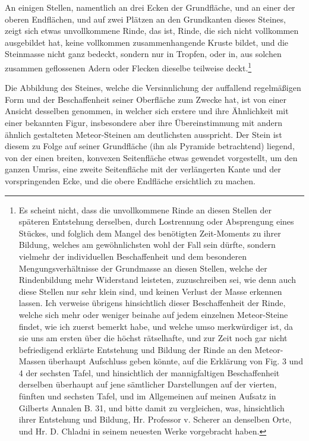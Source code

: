 \documentclass[a4paper, 11pt, oneside, german]{article}
\begin{document}
An einigen Stellen, namentlich an drei Ecken der Grundfläche, und an einer der oberen Endflächen, und auf zwei Plätzen an den Grundkanten dieses Steines, zeigt sich etwas unvollkommene Rinde, das ist, Rinde, die sich nicht vollkommen ausgebildet hat, keine vollkommen zusammenhangende Kruste bildet, und die Steinmasse nicht ganz bedeckt, sondern nur in Tropfen, oder in, aus solchen zusammen geflossenen Adern oder Flecken dieselbe teilweise deckt.\footnote{Es scheint nicht, dass die unvollkommene Rinde an diesen Stellen der späteren Entstehung derselben, durch Lostrennung oder Absprengung eines Stückes, und folglich dem Mangel des benötigten Zeit-Moments zu ihrer Bildung, welches am gewöhnlichsten wohl der Fall sein dürfte, sondern vielmehr der individuellen Beschaffenheit und dem besonderen Mengungsverhältnisse der Grundmasse an diesen Stellen, welche der Rindenbildung mehr Widerstand leisteten, zuzuschreiben sei, wie denn auch diese Stellen nur sehr klein sind, und keinen Verlust der Masse erkennen lassen. Ich verweise übrigens hinsichtlich dieser Beschaffenheit der Rinde, welche sich mehr oder weniger beinahe auf jedem einzelnen Meteor-Steine findet, wie ich zuerst bemerkt habe, und welche umso merkwürdiger ist, da sie uns am ersten über die höchst rätselhafte, und zur Zeit noch gar nicht befriedigend erklärte Entstehung und Bildung der Rinde an den Meteor-Massen überhaupt Aufschluss geben könnte, auf die Erklärung von Fig. 3 und 4 der sechsten Tafel, und hinsichtlich der mannigfaltigen Beschaffenheit derselben überhaupt auf jene sämtlicher Darstellungen auf der vierten, fünften und sechsten Tafel, und im Allgemeinen auf meinen Aufsatz in Gilberts Annalen B. 31, und bitte damit zu vergleichen, was, hinsichtlich ihrer Entstehung und Bildung, Hr. Professor v. Scherer an denselben Orte, und Hr. D. Chladni in seinem neuesten Werke vorgebracht haben.}

Die Abbildung des Steines, welche die Versinnlichung der auffallend regelmäßigen Form und der Beschaffenheit seiner Oberfläche zum Zwecke hat, ist von einer Ansicht desselben genommen, in welcher sich erstere und ihre Ähnlichkeit mit einer bekannten Figur, insbesondere aber ihre Übereinstimmung mit andern ähnlich gestalteten Meteor-Steinen am deutlichsten ausspricht. Der Stein ist diesem zu Folge auf seiner Grundfläche (ihn als Pyramide betrachtend) liegend, von der einen breiten, konvexen Seitenfläche etwas gewendet vorgestellt, um den ganzen Umriss, eine zweite Seitenfläche mit der verlängerten Kante und der vorspringenden Ecke, und die obere Endfläche ersichtlich zu machen.
\end{document}

